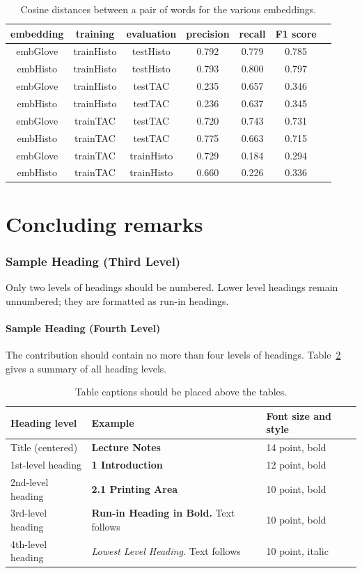 \documentclass[runningheads]{llncs}
\begin{document}
\begin{table}
\centering
\caption{Cosine distances between a pair of words for the various embeddings.}
\label{tab:nnmodel}
\begin{tabular}{|c|c|c|c|c|c|c|}
\hline
{\bfseries embedding} & {\bfseries training} & {\bfseries evaluation} & {\bfseries precision} & {\bfseries recall} & {\bfseries F1 score}\\
\hline
embGlove &  trainHisto & testHisto & 0.792 & 0.779 & 0.785\\
embHisto &  trainHisto & testHisto & 0.793 & 0.800 & 0.797\\
embGlove &  trainHisto & testTAC & 0.235 & 0.657 & 0.346\\
embHisto &  trainHisto & testTAC & 0.236 & 0.637 & 0.345\\
embGlove &  trainTAC & testTAC & 0.720 & 0.743 & 0.731\\
embHisto &  trainTAC & testTAC & 0.775 & 0.663 & 0.715\\
embGlove &  trainTAC & trainHisto & 0.729 & 0.184 & 0.294\\
embHisto &  trainTAC & trainHisto & 0.660 & 0.226 & 0.336\\
\hline
\end{tabular}
\end{table}

\section{Concluding remarks}

\subsubsection{Sample Heading (Third Level)} Only two levels of
headings should be numbered. Lower level headings remain unnumbered;
they are formatted as run-in headings.

\paragraph{Sample Heading (Fourth Level)}
The contribution should contain no more than four levels of
headings. Table~\ref{tab1} gives a summary of all heading levels.

\begin{table}
\caption{Table captions should be placed above the
tables.}\label{tab1}
\begin{tabular}{|l|l|l|}
\hline
Heading level &  Example & Font size and style\\
\hline
Title (centered) &  {\Large\bfseries Lecture Notes} & 14 point, bold\\
1st-level heading &  {\large\bfseries 1 Introduction} & 12 point, bold\\
2nd-level heading & {\bfseries 2.1 Printing Area} & 10 point, bold\\
3rd-level heading & {\bfseries Run-in Heading in Bold.} Text follows & 10 point, bold\\
4th-level heading & {\itshape Lowest Level Heading.} Text follows & 10 point, italic\\
\hline
\end{tabular}
\end{table}
\end{document}
